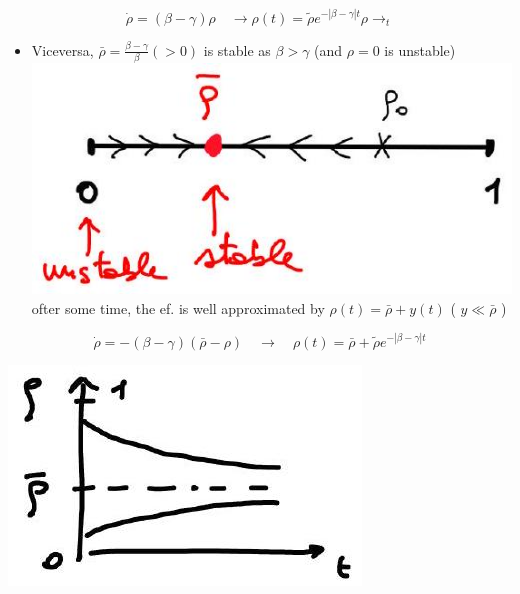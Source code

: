 \documentclass[10pt]{article}
\begin{document}
$$
\dot{\rho}=(\beta-\gamma) \rho \quad \rightarrow \rho(t)=\tilde{\rho} e^{-|\beta-\gamma| t} \rho \rightarrow_{t}
$$

\begin{itemize}
  \item Viceversa, $\bar{\rho}=\frac{\beta-\gamma}{\beta}(>0)$ is stable as $\beta>\gamma$ (and $\rho=0$ is unstable)\\
\includegraphics[max width=\textwidth, center]{2025_10_17_3daf2a002a8f5936c90eg-12(1)}\\
ofter some time, the ef. is well approximated by $\rho(t)=\bar{\rho}+y(t)$ ( $y \ll \bar{\rho}$ )
\end{itemize}

$$
\dot{\rho}=-(\beta-\gamma)(\bar{\rho}-\rho) \quad \rightarrow \quad \rho(t)=\bar{\rho}+\tilde{\rho} e^{-|\beta-\gamma| t}
$$

\begin{center}
\includegraphics[max width=\textwidth]{2025_10_17_3daf2a002a8f5936c90eg-12(2)}
\end{center}
\end{document}

